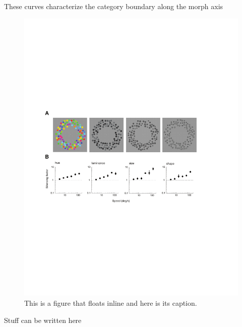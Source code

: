 These curves characterize the category boundary along the morph axis 


\begin{figure}
\includegraphics[width=\textwidth]{figures/fig1}
\caption[Short figure name.]{This is a figure that floats inline and here is its caption.
\label{fig:myInlineFigure}}
\end{figure}

Stuff can be written here








